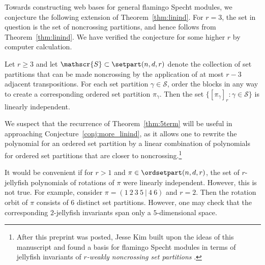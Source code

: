 Towards constructing web bases for general flamingo Specht modules, we conjecture the following extension of Theorem~\ref{thm:linind}.
For $r = 3$, the set in question is the set of noncrossing partitions, and hence follows from Theorem~\ref{thm:linind}. We have verified the conjecture for some higher $r$ by computer calculation.
\begin{conjecture}\label{conj:more_linind}
Let $r \geq 3$ and let $\mathscr{S} \subset \setpart(n,d,r)$ denote the collection of set partitions that can be made noncrossing by the application of at most $r-3$ adjacent transpositions. For each set partition $\gamma \in \mathscr{S}$, order the blocks in any way to create a corresponding ordered set partition $\pi_\gamma$. Then the set $\{ [\pi_\gamma]_r : \gamma \in \mathscr{S} \}$ is linearly independent.
\end{conjecture}

We suspect that the recurrence of Theorem~\ref{thm:5term} will be useful in approaching Conjecture~\ref{conj:more_linind}, as it allows one to rewrite the polynomial for an ordered set partition by a linear combination of polynomials for ordered set partitions that are closer to noncrossing.\footnote{After this preprint was posted, Jesse Kim built upon the ideas of this manuscript and found a basis for flamingo Specht modules in terms of jellyfish invariants of \emph{$r$-weakly noncrossing set partitions} \cite{Kim:3row}.}


It would be convenient if for $r>1$ and $\pi \in \ordsetpart(n,d,r)$, the set of $r$-jellyfish polynomials of rotations of $\pi$ were linearly independent. However, this is not true. For example, consider $\pi = ( 1 \ 2 \ 3 \ 5 \ | \ 4 \ 6 )$ and $r=2$. Then the rotation orbit of $\pi$ consists of $6$ distinct set partitions. However, one may check that the corresponding $2$-jellyfish invariants span only a $5$-dimensional space.

